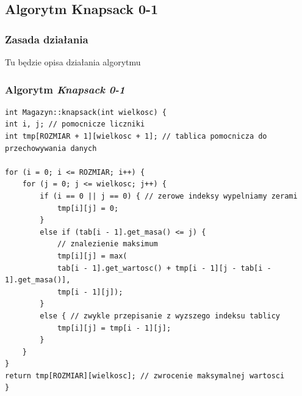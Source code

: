 \documentclass{beamer}
\begin{document}
\subsection{Algorytm Knapsack 0-1}
\begin{frame}
	\frametitle{Zasada działania}
	Tu będzie opisa działania algorytmu
\end{frame}

\begin{frame}[fragile]
	\frametitle{Algorytm \textit{Knapsack 0-1}}
	\begin{lstlisting}[basicstyle=\tiny,tabsize=2]
int Magazyn::knapsack(int wielkosc) {
int i, j; // pomocnicze liczniki
int tmp[ROZMIAR + 1][wielkosc + 1]; // tablica pomocnicza do przechowywania danych

for (i = 0; i <= ROZMIAR; i++) {
	for (j = 0; j <= wielkosc; j++) {
		if (i == 0 || j == 0) { // zerowe indeksy wypelniamy zerami
			tmp[i][j] = 0;
		}
		else if (tab[i - 1].get_masa() <= j) {
			// znalezienie maksimum
			tmp[i][j] = max(
			tab[i - 1].get_wartosc() + tmp[i - 1][j - tab[i - 1].get_masa()],
			tmp[i - 1][j]);
		}
		else { // zwykle przepisanie z wyzszego indeksu tablicy
			tmp[i][j] = tmp[i - 1][j];
		}
	}
}
return tmp[ROZMIAR][wielkosc]; // zwrocenie maksymalnej wartosci
}
	\end{lstlisting}
\end{frame}
\end{document}
